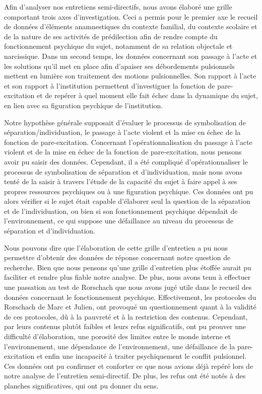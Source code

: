 \documentclass[12pt, a4paper]{book}
\begin{document}
\begin{spacing}{1.5}
Afin d'analyser nos entretiens semi-directifs, nous avons élaboré une grille  comportant trois axes d'investigation. Ceci a permis pour le premier axe  le recueil de données d'éléments anamnestiques du contexte familial, du contexte scolaire et de la nature de ses activités de prédilection afin de rendre compte du fonctionnement psychique du sujet, notamment de sa relation objectale et narcissique. Dans un second temps, les données concernant son passage à l'acte et les solutions qu'il met en place afin d'apaiser ses débordements pulsionnels mettent en lumière son traitement des motions pulsionnelles. Son rapport à l'acte et son rapport à l'institution permettent d'investiguer la fonction de pare-excitation et de repérer à quel moment elle fait  échec dans la dynamique du sujet, en lien avec sa figuration psychique de l'institution. 

Notre hypothèse générale supposait d'évaluer le processus de symbolisation de séparation/individuation, le passage à l'acte violent et la mise en échec de la fonction de pare-excitation. Concernant l'opérationnalisation du passage à l'acte violent et de la mise en échec de la fonction de pare-excitation, nous pensons avoir pu saisir des données. Cependant, il a été compliqué d'opérationnaliser le processus de symbolisation de séparation et d'individuation, mais nous avons tenté de la saisir à travers l'étude de la capacité du sujet à faire appel à ses propres ressources psychiques ou à une figuration psychique. Ces données ont pu alors vérifier si le sujet était capable d'élaborer seul la question de la séparation et de l'individuation, ou bien si son fonctionnement psychique dépendait de l'environnement, ce qui suppose une défaillance au niveau du processus de séparation et d'individuation.

 Nous pouvons dire que l'élaboration de cette grille d'entretien a pu nous permettre d'obtenir des données de réponse concernant notre question de recherche. Bien que nous pensons qu'une grille d'entretien plus étoffée aurait pu faciliter et rendre plus fiable notre analyse. De plus, nous avons tenu à effectuer une passation au test de Rorschach que nous avons jugé utile dans le recueil des données concernant le fonctionnement psychique. Effectivement, les protocoles du Rorschach de Marc et Julien, ont provoqué un questionnement quant à la validité de ces protocoles, dû à la pauvreté et à la restriction des contenus. Cependant, par leurs contenus plutôt faibles et leurs refus significatifs, ont pu prouver une difficulté d'élaboration, une porosité des limites entre le monde interne et l'environnement, une dépendance de l'environnement, une défaillance de la pare-excitation et enfin une incapacité à traiter psychiquement le conflit pulsionnel. Ces données ont pu confirmer et conforter ce que nous avions déjà repéré lors de notre analyse de l'entretien semi-directif. De plus, les refus ont été notés à des planches significatives, qui ont pu donner du sens.


\end{spacing}
\end{document}
